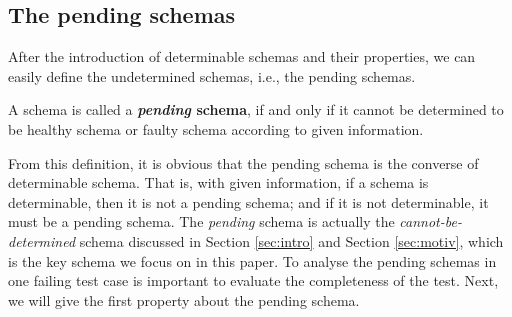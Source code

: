 %
%



\subsection{The pending schemas}\label{sec:pending:pending}

After the introduction of determinable schemas and their properties, we can easily define the undetermined schemas, i.e., the pending schemas.

\begin{definition}\label{de:pending}
A schema is called a \textbf{\emph{pending} schema}, if and only if it cannot be determined to be healthy schema or faulty schema according to given information.
\end{definition}


From this definition, it is obvious that the pending schema is the converse of determinable schema. That is, with given information, if a schema is determinable, then it is not a pending schema; and if it is not determinable, it must be a pending schema. The \emph{pending} schema is actually the \emph{cannot-be-determined} schema discussed in Section \ref{sec:intro} and Section \ref{sec:motiv}, which is the key schema we focus on in this paper. To analyse the pending schemas in one failing test case is important to evaluate the completeness of the test.  Next, we will give the first property about the pending schema.


